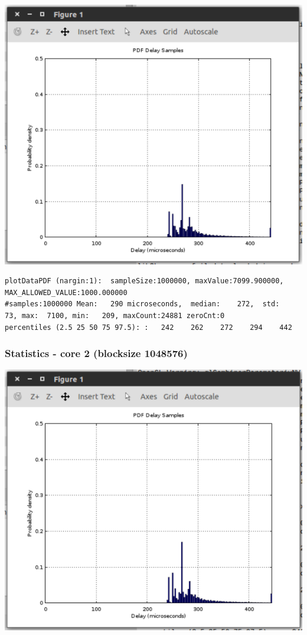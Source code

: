 \documentclass{article}
\begin{document}
\includegraphics{q3/exp3/core1}

\begin{lstlisting}
plotDataPDF (nargin:1):  sampleSize:1000000, maxValue:7099.900000,  MAX_ALLOWED_VALUE:1000.000000
#samples:1000000 Mean:   290 microseconds,  median:    272,  std:     73, max:  7100, min:   209, maxCount:24881 zeroCnt:0
percentiles (2.5 25 50 75 97.5): :   242    262    272    294    442
\end{lstlisting}

\subsubsection{Statistics - core 2 (blocksize 1048576)}

\includegraphics{q3/exp3/core2}
\end{document}
